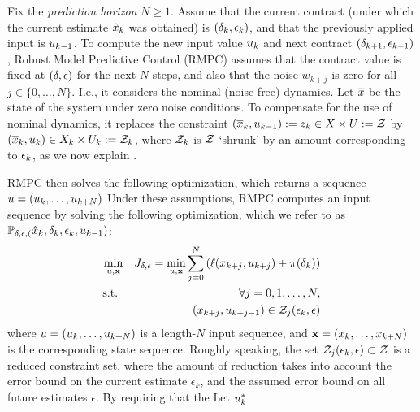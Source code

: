 Fix the \emph{prediction horizon} $N \geq 1$.
Assume that the current contract (under which the current estimate $\hat{x}_k$ was obtained) is $(\delta_{k},\epsilon_{k})$, and that the previously applied input is $u_{k-1}$.
To compute the new input value $u_{k}$ and next contract $(\delta_{k+1},\epsilon_{k+1})$, Robust Model Predictive Control (RMPC) assumes that the contract value is fixed at $(\delta,\epsilon)$ for the next $N$ steps, and also that the noise $w_{k+j}$ is zero for all $j \in \{0,\ldots,N\}$.
I.e., it considers the nominal (noise-free) dynamics.
Let $\overline{x}$ be the state of the system under zero noise conditions.
To compensate for the use of nominal dynamics, it replaces the constraint $(\overline{x}_k,u_{k-1}):= z_k \in X \times U := \mathcal{Z}$ 
by $(\overline{x}_k,u_k) \in X_k \times U_k := \mathcal{Z}_k$,
where $\mathcal{Z}_k$ is $\mathcal{Z}$ `shrunk' by an amount corresponding to $\epsilon_k$, as we now explain . 

RMPC then solves the following optimization, which returns a sequence $u = (u_k,\ldots,u_{k+N})$
Under these assumptions, RMPC computes an input sequence by solving the following optimization, which we refer to as $\mathbb{P_{\delta,\epsilon,(}}\hat{x}_{k},\delta_k,\epsilon_k,u_{k-1})$:
\begin{eqnarray}
\min_{u,\mathbf{x}} && J_{\delta,\epsilon} = \min_{u,\mathbf{x} }\sum_{j=0}^{N}\left(\ell(x_{k+j},u_{k+j})+\pi(\delta_k)\right)
\\
\textrm{s.t. } && \forall j = 0,1,\ldots, N, 
\\
&& (x_{k+j},u_{k+j-1}) \in \mathcal{Z}_j(\epsilon_k,\epsilon)
\\
\end{eqnarray}
where $u = (u_k,\ldots,u_{k+N})$ is a length-$N$ input sequence, and $\mathbf{x} = (x_k,\ldots,x_{k+N})$ is the corresponding state sequence.
Roughly speaking, the set $\mathcal{Z}_j(\epsilon_k,\epsilon) \subset \mathcal{Z}$ is a reduced constraint set, where the amount of reduction takes into account the error bound on the current estimate $\epsilon_k$, and the assumed error bound on all future estimates $\epsilon$.
By requiring that the 
Let $u^*_k$



